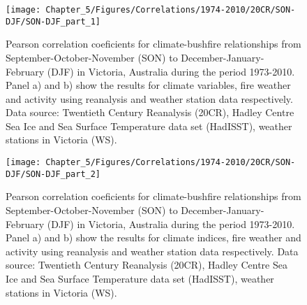 \begin{figure}[h]
\noindent \begin{centering}
\texttt{[image: Chapter\_5/Figures/Correlations/1974-2010/20CR/SON-DJF/SON-DJF\_part\_1]}
\par\end{centering}

\caption[Pearson correlation coeficients for climate-bushfire relationships
from September-October-November (SON) to December-January-February
(DJF) in Victoria, Australia during the period 1973-2010]{Pearson correlation coeficients for climate-bushfire relationships
from September-October-November (SON) to December-January-February
(DJF) in Victoria, Australia during the period 1973-2010. Panel a)
and b) show the results for climate variables, fire weather and activity
using reanalysis and weather station data respectively. Data source:
Twentieth Century Reanalysis (20CR), Hadley Centre Sea Ice and Sea
Surface Temperature data set (HadISST), weather stations in Victoria
(WS). \label{fig:Pearson correlation coeficients for climate-bushfire relationships from September-October-November to December-January-February in Victoria, Australia during the period 1973-2010 (part 1)}}
\end{figure}


\begin{figure}[h]
\noindent \begin{centering}
\texttt{[image: Chapter\_5/Figures/Correlations/1974-2010/20CR/SON-DJF/SON-DJF\_part\_2]}
\par\end{centering}

\caption[earson correlation coeficients for climate-bushfire relationships
from September-October-November (SON) to December-January-February
(DJF) in Victoria, Australia during the period 1973-2010]{Pearson correlation coeficients for climate-bushfire relationships
from September-October-November (SON) to December-January-February
(DJF) in Victoria, Australia during the period 1973-2010. Panel a)
and b) show the results for climate indices, fire weather and activity
using reanalysis and weather station data respectively. Data source:
Twentieth Century Reanalysis (20CR), Hadley Centre Sea Ice and Sea
Surface Temperature data set (HadISST), weather stations in Victoria
(WS).\label{fig:Pearson correlation coeficients for climate-bushfire relationships from September-October-November to December-January-February in Victoria, Australia during the period 1973-2010 (part 2)}}
\end{figure}



